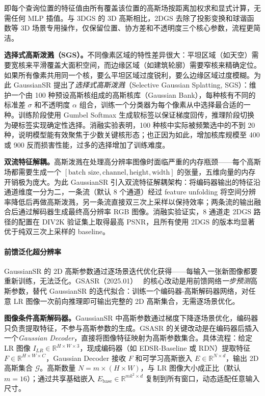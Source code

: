 即每个查询位置的特征值由所有覆盖该位置的高斯场按距离加权求和显式计算，无需任何 MLP 插值。与 3DGS 的 3D 高斯相比，2DGS 去除了投影变换和球谐函数等 3D 场景专用操作，仅保留位置、协方差和不透明度三个核心参数，流程更简洁。

\textbf{选择式高斯泼溅（SGS）。}不同像素区域的特性差异很大：平坦区域（如天空）需要宽核来平滑覆盖大面积空间，而边缘区域（如建筑轮廓）需要窄核来精确定位。如果所有像素共用同一个核，要么平坦区域过度锐利，要么边缘区域过度模糊。为此 GaussianSR 提出了\emph{选择式高斯泼溅}（Selective Gaussian Splatting, SGS）：维护一个由 100 种预设高斯核组成的高斯核库（Gaussian Bank），每种核有不同的标准差 $\sigma$ 和不透明度 $\alpha$ 组合，训练一个分类器为每个像素从中选择最合适的一种。训练阶段使用 Gumbel Softmax 生成软标签以保证梯度回传，推理阶段切换为硬标签实现确定性选择。消融实验表明，100 种核中实际被频繁选中的不到 20 种，说明模型能有效聚焦于少数关键核形态；也正因为如此，增加核库规模至 400 或 900 反而损害性能，过多的选择增加了训练难度。

\textbf{双流特征解耦。}高斯泼溅在处理高分辨率图像时面临严重的内存瓶颈——每个高斯场都需要生成一个 $[\text{batch size}, \text{channel}, \text{height}, \text{width}]$ 的张量，五维向量的内存开销极为庞大。为此 GaussianSR 引入双流特征解耦架构：将编码器输出的特征沿通道维度一分为二，一条流（默认 8 个通道）经过 feature unfolding 将空间分辨率降低后再做高斯泼溅，另一条流直接双三次上采样以保持效率；两条流的输出融合后通过解码器生成最终高分辨率 RGB 图像。消融实验证实，8 通道走 2DGS 路径的配置在 DIV2K 验证集上取得最高 PSNR，且所有使用 2DGS 的版本均显著优于纯双三次上采样的 baseline。

\paragraph{前馈泛化超分辨率}

GaussianSR 的 2D 高斯参数通过逐场景迭代优化获得——每输入一张新图像都要重新训练，无法泛化。GSASR（2025.01）~\cite{2501_06838} 的核心改动是用前馈网络\emph{一步预测}高斯参数，替代 GaussianSR 的迭代拟合：训练一个编码器-高斯解码器网络，对任意 LR 图像一次前向推理即可输出完整的 2D 高斯集合，无需逐场景优化。

\textbf{图像条件高斯解码器。}GaussianSR 中高斯参数通过梯度下降逐场景优化，编码器只负责提取特征，不参与高斯参数的生成。GSASR 的关键改动是在编码器后插入一个\emph{Gaussian Decoder}，直接将图像特征映射为高斯参数集合。具体流程：给定 LR 图像 $I_{LR} \in \mathbb{R}^{H \times W \times 3}$，现成编码器（如 EDSR-Baseline 或 RDN）提取特征 $F \in \mathbb{R}^{H \times W \times C}$，Gaussian Decoder 接收 $F$ 和可学习高斯嵌入 $E \in \mathbb{R}^{N \times d}$，输出 2D 高斯集合 $\mathcal{G}$。高斯数量 $N = m \times (H \times W)$，与 LR 图像大小成正比（默认 $m=16$）；通过共享基础嵌入 $E_{\text{base}} \in \mathbb{R}^{mk^2 \times d}$ 复制到所有窗口，动态适配任意输入尺寸。

